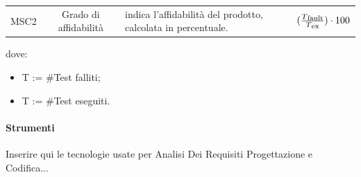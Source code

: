 \begin{itemize}
\begin{table}[H]
\begin{tabular}{ccp{7cm}c}
                  MSC2  &  Grado di affidabilità  &  indica l'affidabilità del prodotto, calcolata in percentuale.  & \Large$(\frac{T\mysubscript{fault}}{T\mysubscript{ex}})\cdot100$ \\    
                  \end{tabular}
            \end{table}
            dove:
            \begin{itemize}
                \item[] T := \#Test falliti;
                \item[] T := \#Test eseguiti.
            \end{itemize}

        \end{itemize}
            
	


        \paragraph{Strumenti}    \label{paragraph:Strumenti}
        Inserire qui le tecnologie usate per Analisi Dei Requisiti Progettazione e Codifica... 
